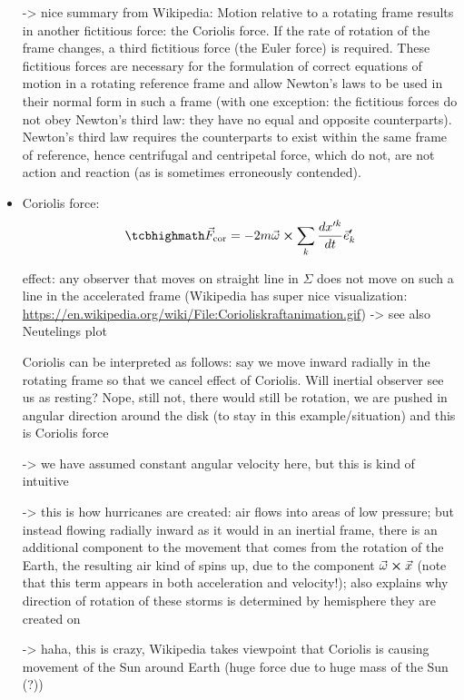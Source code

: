 \documentclass[../class_mech_main.tex]{subfiles}
\begin{document}
\begin{itemize}
    -> nice summary from Wikipedia: Motion relative to a rotating frame results in another fictitious force: the Coriolis force. If the rate of rotation of the frame changes, a third fictitious force (the Euler force) is required. These fictitious forces are necessary for the formulation of correct equations of motion in a rotating reference frame and allow Newton's laws to be used in their normal form in such a frame (with one exception: the fictitious forces do not obey Newton's third law: they have no equal and opposite counterparts). Newton's third law requires the counterparts to exist within the same frame of reference, hence centrifugal and centripetal force, which do not, are not action and reaction (as is sometimes erroneously contended).


    \item Coriolis force:
    \begin{equation}\label{eq:f_coriolis}
		\eqbox{
			\vec{F}_\mathrm{cor} = - 2 m \vec{\omega} \cross \sum_k \dv{x'^k}{t} \vec{e}'_k
		}
	\end{equation}

	effect: any observer that moves on straight line in $\Sigma$ does not move on such a line in the accelerated frame (Wikipedia has super nice visualization: \url{https://en.wikipedia.org/wiki/File:Corioliskraftanimation.gif}) -> see also Neutelings plot

	
	Coriolis can be interpreted as follows: say we move inward radially in the rotating frame so that we cancel effect of Coriolis. Will inertial observer see us as resting? Nope, still not, there would still be rotation, we are pushed in angular direction around the disk (to stay in this example/situation) and this is Coriolis force
    
    -> we have assumed constant angular velocity here, but this is kind of intuitive
    
    
    -> this is how hurricanes are created: air flows into areas of low pressure; but instead flowing radially inward as it would in an inertial frame, there is an additional component to the movement that comes from the rotation of the Earth, the resulting air kind of spins up, due to the component $\vec{\omega} \cross \vec{x}$ (note that this term appears in both acceleration and velocity!); also explains why direction of rotation of these storms is determined by hemisphere they are created on

    -> haha, this is crazy, Wikipedia takes viewpoint that Coriolis is causing movement of the Sun around Earth (huge force due to huge mass of the Sun (?))



\end{itemize}
\end{document}
